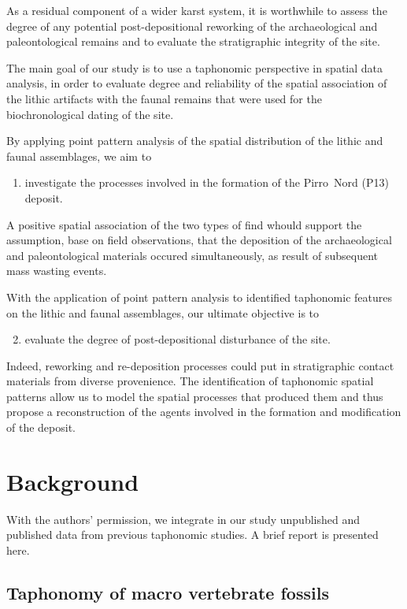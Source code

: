 \documentclass[review,authoryear]{elsarticle} %
\begin{document}
As a residual component of a wider karst system, it is worthwhile to assess the degree of any potential post-depositional reworking of the archaeological and paleontological remains and to evaluate the stratigraphic integrity of the site. 

The main goal of our study is to use a taphonomic perspective in spatial data analysis, in order to evaluate degree and reliability of the spatial association of the lithic artifacts with the faunal remains that were used for the biochronological dating of the site.

By applying point pattern analysis of the spatial distribution of the lithic and faunal assemblages, we aim to
\begin{enumerate}
  \item investigate the processes involved in the formation of the Pirro~Nord (P13) deposit.
\end{enumerate}
A positive spatial association of the two types of find whould support the assumption, base on field observations, that the deposition of the archaeological and paleontological materials occured simultaneously, as result of subsequent mass wasting events.

With the application of point pattern analysis to identified taphonomic features on the lithic and faunal assemblages, our ultimate objective is to 
\begin{enumerate}
  \setcounter{enumi}{1}
  \item evaluate the degree of post-depositional disturbance of the site.
\end{enumerate}
Indeed, reworking and re-deposition processes could put in stratigraphic contact materials from diverse provenience. The identification of taphonomic spatial patterns allow us to model the spatial processes that produced them and thus propose a reconstruction of the agents involved in the formation and modification of the deposit.

\section{Background}

With the authors' permission, we integrate in our study unpublished \citep{Bagnus2011} and published \citep{Arzarello2012,Arzarello2014} data from previous taphonomic studies. A brief report is presented here.

\subsection{Taphonomy of macro vertebrate fossils}
\end{document}
